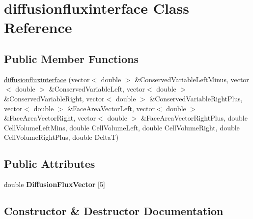 \hypertarget{classdiffusionfluxinterface}{}\section{diffusionfluxinterface Class Reference}
\label{classdiffusionfluxinterface}
\subsection*{Public Member Functions}
\begin{DoxyCompactItemize}
\item 
\hyperlink{classdiffusionfluxinterface_a30feb61f31b2c40063fc4ca7ca16258e}{diffusionfluxinterface} (vector$<$ double $>$ \&Conserved\+Variable\+Left\+Minus, vector$<$ double $>$ \&Conserved\+Variable\+Left, vector$<$ double $>$ \&Conserved\+Variable\+Right, vector$<$ double $>$ \&Conserved\+Variable\+Right\+Plus, vector$<$ double $>$ \&Face\+Area\+Vector\+Left, vector$<$ double $>$ \&Face\+Area\+Vector\+Right, vector$<$ double $>$ \&Face\+Area\+Vector\+Right\+Plus, double Cell\+Volume\+Left\+Mins, double Cell\+Volume\+Left, double Cell\+Volume\+Right, double Cell\+Volume\+Right\+Plus, double DeltaT)
\end{DoxyCompactItemize}
\subsection*{Public Attributes}
\begin{DoxyCompactItemize}
\item 
double {\bfseries Diffusion\+Flux\+Vector} \mbox{[}5\mbox{]}\hypertarget{classdiffusionfluxinterface_a2e1da15c8bd0876ddb087c5cab930a28}{}\label{classdiffusionfluxinterface_a2e1da15c8bd0876ddb087c5cab930a28}

\end{DoxyCompactItemize}


\subsection{Constructor \& Destructor Documentation}
